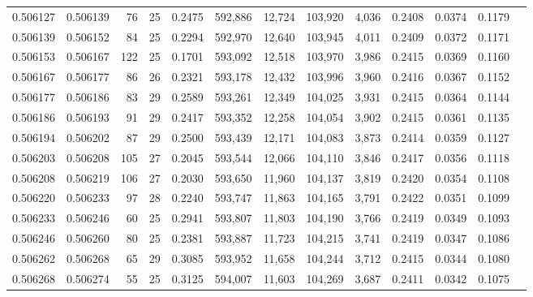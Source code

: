 \begin{tabular}{rrrrrrrrrrrrr}
0.506127 & 0.506139 &  76 &  25 &                                     0.2475 & 592,886 &  12,724 & 103,920 &   4,036 & 0.2408 & 0.0374 & 0.1179 \\
0.506139 & 0.506152 &  84 &  25 &                                     0.2294 & 592,970 &  12,640 & 103,945 &   4,011 & 0.2409 & 0.0372 & 0.1171 \\
0.506153 & 0.506167 & 122 &  25 &                                     0.1701 & 593,092 &  12,518 & 103,970 &   3,986 & 0.2415 & 0.0369 & 0.1160 \\
0.506167 & 0.506177 &  86 &  26 &                                     0.2321 & 593,178 &  12,432 & 103,996 &   3,960 & 0.2416 & 0.0367 & 0.1152 \\
0.506177 & 0.506186 &  83 &  29 &                                     0.2589 & 593,261 &  12,349 & 104,025 &   3,931 & 0.2415 & 0.0364 & 0.1144 \\
0.506186 & 0.506193 &  91 &  29 &                                     0.2417 & 593,352 &  12,258 & 104,054 &   3,902 & 0.2415 & 0.0361 & 0.1135 \\
0.506194 & 0.506202 &  87 &  29 &                                     0.2500 & 593,439 &  12,171 & 104,083 &   3,873 & 0.2414 & 0.0359 & 0.1127 \\
0.506203 & 0.506208 & 105 &  27 &                                     0.2045 & 593,544 &  12,066 & 104,110 &   3,846 & 0.2417 & 0.0356 & 0.1118 \\
0.506208 & 0.506219 & 106 &  27 &                                     0.2030 & 593,650 &  11,960 & 104,137 &   3,819 & 0.2420 & 0.0354 & 0.1108 \\
0.506220 & 0.506233 &  97 &  28 &                                     0.2240 & 593,747 &  11,863 & 104,165 &   3,791 & 0.2422 & 0.0351 & 0.1099 \\
0.506233 & 0.506246 &  60 &  25 &                                     0.2941 & 593,807 &  11,803 & 104,190 &   3,766 & 0.2419 & 0.0349 & 0.1093 \\
0.506246 & 0.506260 &  80 &  25 &                                     0.2381 & 593,887 &  11,723 & 104,215 &   3,741 & 0.2419 & 0.0347 & 0.1086 \\
0.506262 & 0.506268 &  65 &  29 &                                     0.3085 & 593,952 &  11,658 & 104,244 &   3,712 & 0.2415 & 0.0344 & 0.1080 \\
0.506268 & 0.506274 &  55 &  25 &                                     0.3125 & 594,007 &  11,603 & 104,269 &   3,687 & 0.2411 & 0.0342 & 0.1075 \\

\end{tabular}
